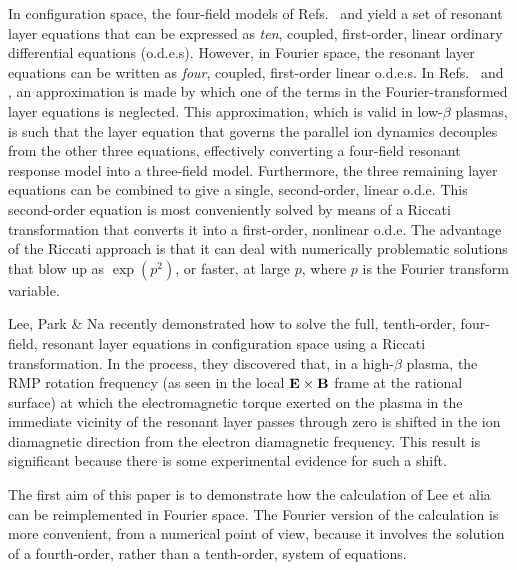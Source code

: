 \documentclass[12pt,prb,aps]{revtex4-1}
\begin{document}
 In configuration space, the four-field models of Refs.~ and  yield a set of resonant layer equations that can be expressed as 
 {\em ten},   coupled,
 first-order, linear ordinary differential equations (o.d.e.s).\cite{lee} However, in Fourier space, the resonant layer equations can be written as 
 {\em four}, coupled,  first-order linear o.d.e.s.\cite{cole} In Refs.~
 and , an approximation is made by which one of the terms in the Fourier-transformed layer equations is neglected. This
 approximation, which is valid in low-$\beta$ plasmas,  is such that the layer equation that governs the parallel ion dynamics decouples from the other three equations, effectively
 converting a four-field resonant response model into a three-field model. Furthermore, the three remaining layer equations can be combined to give a
 single, second-order, linear o.d.e. This second-order equation is most conveniently solved  by means of a Riccati transformation
 that converts it into a first-order, nonlinear o.d.e.\cite{ric1,ric2,ric3} The advantage of the Riccati approach is that it can deal with numerically problematic  solutions
 that blow up as $\exp(p^2)$, or faster, at large $p$, where $p$ is the Fourier transform variable. 
 
 Lee, Park \& Na\cite{lee} recently demonstrated  how to solve the full, tenth-order, four-field,  resonant layer equations in configuration space using a Riccati transformation. In the process, they discovered that, in a high-$\beta$ plasma,  the RMP rotation frequency (as seen in the local ${\bf E}\times {\bf B}$ frame
 at the rational surface)  at which the electromagnetic torque exerted on the plasma in the immediate vicinity of the resonant layer passes through zero is shifted in the ion diamagnetic direction from the electron diamagnetic frequency.
 This result is significant because there is some experimental evidence for such a shift.\cite{textor1,textor2,paz} 
 
 The first aim of this paper is to demonstrate how the calculation of
 Lee et alia can be reimplemented in Fourier space. The Fourier version of the calculation is more convenient, from a numerical point of view, because
 it involves the solution of a fourth-order, rather than a tenth-order, system of equations. 
 
\end{document}
